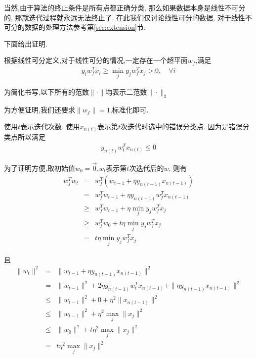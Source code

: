 \documentclass[a4paper,12pt]{article}
\begin{document}
		当然,由于算法的终止条件是所有点都正确分类,
		那么如果数据本身是线性不可分的,
		那就迭代过程就永远无法终止了.
		在此我们仅讨论线性可分的数据,
		对于线性不可分的数据的处理方法参考第\ref{sec:extension}节.

		下面给出证明.
		
        根据线性可分定义,对于线性可分的情况,一定存在一个超平面$w_f$,满足
        \begin{eqnarray}
            y_i w_f^T x_i \ge \min_j y_j w_f^T x_j > 0, \quad \forall i
		\end{eqnarray}
		
		为简化书写,以下所有的范数$\|\cdot\|$均表示二范数$\|\cdot\|_2$
		
		为方便证明,我们还要求$\|w_f\|=1$,标准化即可.

        使用$t$表示迭代次数.
        使用$x_{n(t)}$表示第$t$次迭代时选中的错误分类点.
        因为是错误分类点所以满足
        \begin{eqnarray}
            y_{n(t)} w_t^T x_{n(t)} \le 0
		\end{eqnarray}
		
        为了证明方便,取初始值$w_0=\vec{0}$,$w_t$表示第$t$次迭代后的$w$,
        则有
        \begin{eqnarray}
            w_f^T w_t & = & w_f^T (w_{t-1} + \eta y_{n(t-1)} x_{n(t-1)}) \\
            & = & w_f^T w_{t-1} + \eta y_{n(t-1)} w_f^T x_{n(t-1)} \\
            & \ge & w_f^T w_{t-1} + \eta \min_j y_j w_f^T x_j \\
            & \ge & w_f^T w_{0} + t \eta \min_j y_j w_f^T x_j \\
            & = & t \eta \min_j y_j w_f^T x_j
		\end{eqnarray}
		
        且
        \begin{eqnarray}
            \|w_t\|^2 & = & \| w_{t-1} + \eta y_{n(t-1)} x_{n(t-1)} \|^2 \\
			& = & \| w_{t-1}\|^2 + 2\eta y_{n(t-1)} w_t^T x_{n(t-1)}
			+ \| \eta y_{n(t-1)} x_{n(t-1)} \|^2 \\
            & \le & \| w_{t-1}\|^2 + 0 + \eta^2 \| x_{n(t-1)} \|^2 \\
            & \le & \| w_{t-1}\|^2 + \eta^2 \max_j \| x_j \|^2 \\
            & \le & \|w_0\|^2 + t \eta^2 \max_j \| x_j \|^2 \\
            & = &  t \eta^2 \max_j \| x_j \|^2
		\end{eqnarray}
		
\end{document}

